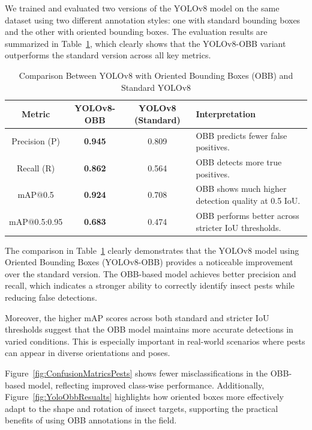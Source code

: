 We trained and evaluated two versions of the YOLOv8 model on the same dataset using two different annotation styles: one with standard bounding boxes and the other with oriented bounding boxes. The evaluation results are summarized in Table~\ref{tab:yolo_comparison}, which clearly shows that the YOLOv8-OBB variant outperforms the standard version across all key metrics.
\begin{table}[H]
\centering
\renewcommand{\arraystretch}{1.5}
\setlength{\tabcolsep}{8pt}
\caption{Comparison Between YOLOv8 with Oriented Bounding Boxes (OBB) and Standard YOLOv8}
\begin{tabular}{|c|c|c|p{6cm}|}
\hline
\textbf{Metric} & \textbf{YOLOv8-OBB} & \textbf{YOLOv8 (Standard)} & \textbf{Interpretation} \\
\hline
Precision (P) & \textbf{0.945} & 0.809 & OBB predicts fewer false positives. \\
\hline
Recall (R) & \textbf{0.862} & 0.564 & OBB detects more true positives. \\
\hline
mAP@0.5 & \textbf{0.924} & 0.708 & OBB shows much higher detection quality at 0.5 IoU. \\
\hline
mAP@0.5:0.95 & \textbf{0.683} & 0.474 & OBB performs better across stricter IoU thresholds. \\
\hline
\end{tabular}
\label{tab:yolo_comparison}
\end{table}

The comparison in Table~\ref{tab:yolo_comparison} clearly demonstrates that the YOLOv8 model using Oriented Bounding Boxes (YOLOv8-OBB) provides a noticeable improvement over the standard version. The OBB-based model achieves better precision and recall, which indicates a stronger ability to correctly identify insect pests while reducing false detections.

Moreover, the higher mAP scores across both standard and stricter IoU thresholds suggest that the OBB model maintains more accurate detections in varied conditions. This is especially important in real-world scenarios where pests can appear in diverse orientations and poses.

Figure~\ref{fig:ConfusionMatricsPests} shows fewer misclassifications in the OBB-based model, reflecting improved class-wise performance. Additionally, Figure~\ref{fig:YoloObbResualts} highlights how oriented boxes more effectively adapt to the shape and rotation of insect targets, supporting the practical benefits of using OBB annotations in the field.

